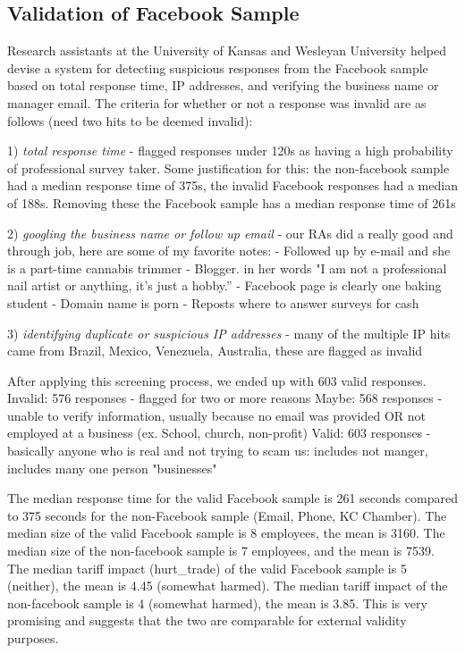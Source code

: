 \subsection{Validation of Facebook Sample}

Research assistants at the University of Kansas and Wesleyan University helped devise a system for detecting suspicious responses from the Facebook sample based on total response time, IP addresses, and verifying the business name or manager email. The criteria for whether or not a response was invalid are as follows (need two hits to be deemed invalid): 

1) \textit{total response time} - flagged responses under 120s as having a high probability of professional survey taker. Some justification for this: the non-facebook sample had a median response time of 375s, the invalid Facebook responses had a median of 188s. Removing these the Facebook sample has a median response time of 261s 

2) \textit{googling the business name or follow up email} - our RAs did a really good and through job, here are some of my favorite notes: 
- Followed up by e-mail and she is a part-time cannabis trimmer 
- Blogger. in her words "I am not a professional nail artist or anything, it's just a hobby.”
- Facebook page is clearly one baking student
- Domain name is porn
- Reposts where to answer surveys for cash 

3) \textit{identifying duplicate or suspicious IP addresses} - many of the multiple IP hits came from Brazil, Mexico, Venezuela, Australia, these are flagged as invalid 

After applying this screening process, we ended up with 603 valid responses. 
Invalid: 576 responses - flagged for two or more reasons 
Maybe: 568 responses - unable to verify information, usually because no email was provided OR not employed at a business (ex. School, church, non-profit) 
Valid: 603 responses - basically anyone who is real and not trying to scam us: includes not manger, includes many one person "businesses"

The median response time for the valid Facebook sample is 261 seconds compared to 375 seconds for the non-Facebook sample (Email, Phone, KC Chamber). The median size of the valid Facebook sample is 8 employees, the mean is 3160. The median size of the non-facebook sample is 7 employees, and the mean is 7539. The median tariff impact (hurt\_trade) of the valid Facebook sample is 5 (neither), the mean is 4.45 (somewhat harmed). The median tariff impact of the non-facebook sample is 4 (somewhat harmed), the mean is 3.85. This is very promising and suggests that the two are comparable for external validity purposes.  

